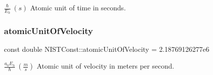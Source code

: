 $\frac{\hbar}{E_h} \ (s)$ Atomic unit of time in seconds. \mbox{\label{group___n_i_s_t_const-_atomic_unit_gaf22e630a5412176c4d94dbc8b1e36f70}} 
\subsubsection{\texorpdfstring{atomic\+Unit\+Of\+Velocity}{atomicUnitOfVelocity}}
{\footnotesize\ttfamily const double N\+I\+S\+T\+Const\+::atomic\+Unit\+Of\+Velocity = 2.\+18769126277e6}

$\frac{a_0 E_h}{\hbar} \ (\frac{m}{s})$ Atomic unit of velocity in meters per second. 